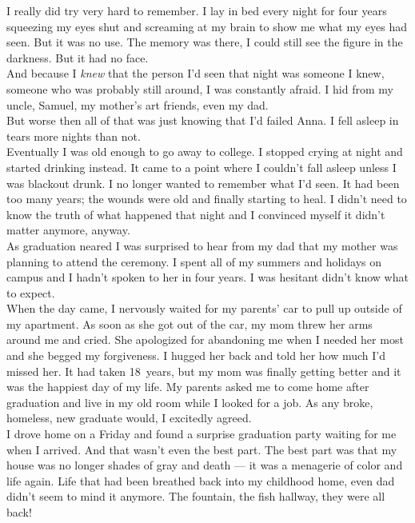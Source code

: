 \documentclass[a5paper]{scrartcl}
\begin{document}
I really did try very hard to remember. I lay in bed every night for four years squeezing my eyes shut and screaming at my brain to show me what my eyes had seen. But it was no use. The memory was there, I could still see the figure in the darkness. But it had no face.\\


And because I \textit{knew}
 that the person I'd seen that night was someone I knew, someone who was probably still around, I was constantly afraid. I hid from my uncle, Samuel, my mother's art friends, even my dad. \\


But worse then all of that was just knowing that I'd failed Anna. I fell asleep in tears more nights than not.\\


Eventually I was old enough to go away to college. I stopped crying at night and started drinking instead. It came to a point where I couldn't fall asleep unless I was blackout drunk.  I no longer wanted to remember what I'd seen. It had been too many years; the wounds were old and finally starting to heal. I didn't need to know the truth of what happened that night and I convinced myself it didn't matter anymore, anyway. \\


As graduation neared I was surprised to hear from my dad that my mother was planning to attend the ceremony.  I spent all of my summers and holidays on campus and I hadn't spoken to her in four years. I was hesitant didn't know what to expect.\\


When the day came, I nervously waited for my parents' car to pull up outside of my apartment. As soon as she got out of the car, my mom threw her arms around me and cried. She apologized for abandoning me when I needed her most and she begged my forgiveness. I hugged her back and told her how much I'd missed her. It had taken 18~years, but my mom was finally getting better and it was the happiest day of my life. My parents asked me to come home after graduation and live in my old room while I looked for a job. As any broke, homeless, new graduate would, I excitedly agreed.\\


I drove home on a Friday and found a surprise graduation party waiting for me when I arrived. And that wasn't even the best part. The best part was that my house was no longer shades of gray and death --- it was a menagerie of color and life again. Life that had been breathed back into my childhood home, even dad didn't seem to mind it anymore. The fountain, the fish hallway, they were all back! \\
\end{document}
